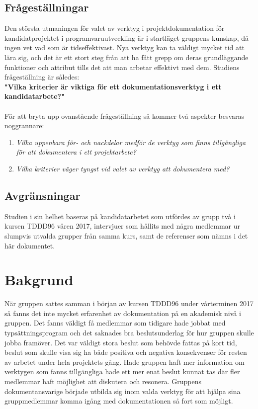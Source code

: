 \subsection{Frågeställningar}
\label{sec:wassing-research-questions}
Den största utmaningen för valet av verktyg i projektdokumentation för kandidatprojektet i programvaruutveckling är i startläget gruppens kunskap, då ingen vet vad som är tidseffektivast. Nya verktyg kan ta väldigt mycket tid att lära sig, och det är ett stort steg från att ha fått grepp om deras grundläggande funktioner och attribut tills det att man arbetar effektivt med dem. Studiens frågeställning är således: \\

\textbf{"Vilka kriterier är viktiga för ett dokumentationsverktyg i ett kandidatarbete?"} \\ \\
För att bryta upp ovanstående frågeställning så kommer två aspekter besvaras noggrannare:
\begin{enumerate}
\item \textit{Vilka uppenbara för- och nackdelar medför de verktyg som finns tillgängliga för att dokumentera i ett projektarbete?}
\item \textit{Vilka kriterier väger tyngst vid valet av verktyg att dokumentera med?}
\end{enumerate}

\subsection{Avgränsningar}
\label{sec:wassing-delimitations}
Studien i sin helhet baseras på kandidatarbetet som utfördes av grupp två i kursen TDDD96 våren 2017, intervjuer som hållits med några medlemmar ur slumpvis utvalda grupper från samma kurs, samt de referenser som nämns i det här dokumentet.

\section{Bakgrund}
När gruppen sattes samman i början av kursen TDDD96 under vårterminen 2017 så fanns det inte mycket erfarenhet av dokumentation på en akademisk nivå i gruppen. Det fanns väldigt få medlemmar som tidigare hade jobbat med typsättningsprogram och det saknades bra beslutsunderlag för hur gruppen skulle jobba framöver. Det var väldigt stora beslut som behövde fattas på kort tid, beslut som skulle visa sig ha både positiva och negativa konsekvenser för resten av arbetet under hela projektets gång. Hade gruppen haft mer information om verktygen som fanns tillgängliga hade ett mer enat beslut kunnat tas där fler medlemmar haft möjlighet att diskutera och resonera. Gruppens dokumentansvarige började utbilda sig inom valda verktyg för att hjälpa sina gruppmedlemmar komma igång med dokumentationen så fort som möjligt.

